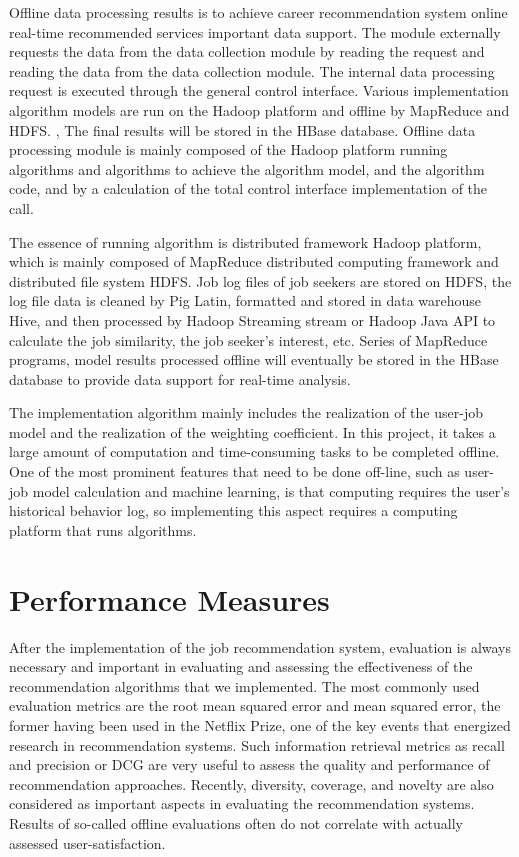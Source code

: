 \documentclass[sigconf]{acmart}
\begin{document}
\par Offline data processing results is to achieve career recommendation system online real-time recommended services important data support. The module externally requests the data from the data collection module by reading the request and reading the data from the data collection module. The internal data processing request is executed through the general control interface. Various implementation algorithm models are run on the Hadoop platform and offline by MapReduce and HDFS. , The final results will be stored in the HBase database. Offline data processing module is mainly composed of the Hadoop platform running algorithms and algorithms to achieve the algorithm model, and the algorithm code, and by a calculation of the total control interface implementation of the call.

\par The essence of running algorithm is distributed framework Hadoop platform, which is mainly composed of MapReduce distributed computing framework and distributed file system HDFS. Job log files of job seekers are stored on HDFS, the log file data is cleaned by Pig Latin, formatted and stored in data warehouse Hive, and then processed by Hadoop Streaming stream or Hadoop Java API to calculate the job similarity, the job seeker's interest, etc. Series of MapReduce programs, model results processed offline will eventually be stored in the HBase database to provide data support for real-time analysis.

\par The implementation algorithm mainly includes the realization of the user-job model and the realization of the weighting coefficient. In this project, it takes a large amount of computation and time-consuming tasks to be completed offline. One of the most prominent features that need to be done off-line, such as user-job model calculation and machine learning, is that computing requires the user's historical behavior log, so implementing this aspect requires a computing platform that runs algorithms.




\section{Performance Measures}
After the implementation of the job recommendation system, evaluation is always necessary and important in evaluating and assessing the effectiveness of the recommendation algorithms that we implemented. The most commonly used evaluation metrics are the root mean squared error and mean squared error, the former having been used in the Netflix Prize, one of the key events that energized research in recommendation systems. Such information retrieval metrics as recall and precision or DCG are very useful to assess the quality and performance of recommendation approaches. Recently, diversity, coverage, and novelty are also considered as important aspects in evaluating the recommendation systems. Results of so-called offline evaluations often do not correlate with actually assessed user-satisfaction.
\end{document}
